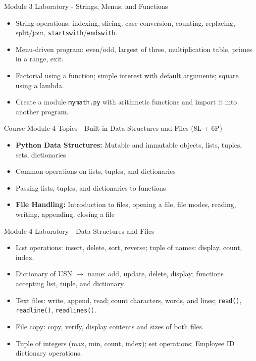 \documentclass[aspectratio=169]{beamer}
\begin{document}
\begin{frame}{Module 3 Laboratory - Strings, Menus, and Functions}
\begin{itemize}
\item String operations: indexing, slicing, case conversion, counting, replacing, split/join, \texttt{startswith}/\texttt{endswith}.
\item Menu-driven program: even/odd, largest of three, multiplication table, primes in a range, exit.
\item Factorial using a function; simple interest with default arguments; square using a lambda.
\item Create a module \texttt{mymath.py} with arithmetic functions and import it into another program.
\end{itemize}
\end{frame}

\begin{frame}{Course Module 4 Topics - Built-in Data Structures and Files (8L + 6P)}
\begin{itemize}
\item \textbf{Python Data Structures:} Mutable and immutable objects, lists, tuples, sets, dictionaries
\item Common operations on lists, tuples, and dictionaries
\item Passing lists, tuples, and dictionaries to functions
\item \textbf{File Handling:} Introduction to files, opening a file, file modes, reading, writing, appending, closing a file
\end{itemize}
\end{frame}

\begin{frame}{Module 4 Laboratory - Data Structures and Files}
\begin{itemize}
\item List operations: insert, delete, sort, reverse; tuple of names: display, count, index.
\item Dictionary of USN $\rightarrow$ name: add, update, delete, display; functions accepting list, tuple, and dictionary.
\item Text files: write, append, read; count characters, words, and lines; \texttt{read()}, \texttt{readline()}, \texttt{readlines()}.
\item File copy: copy, verify, display contents and sizes of both files.
\item Tuple of integers (max, min, count, index); set operations; Employee ID dictionary operations.
\end{itemize}
\end{frame}
\end{document}
